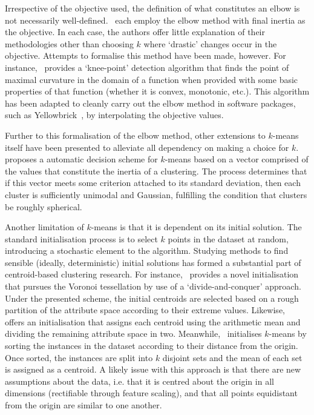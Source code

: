 Irrespective of the objective used, the definition of what constitutes an elbow
is not necessarily well-defined.~\cite{Sujatha2013,Syakur2018} each employ the
elbow method with final inertia as the objective. In each case, the authors
offer little explanation of their methodologies other than choosing \(k\) where
`drastic' changes occur in the objective. Attempts to formalise this method have
been made, however. For instance,~\cite{Satopaa2011} provides a `knee-point'
detection algorithm that finds the point of maximal curvature in the domain of a
function when provided with some basic properties of that function (whether it
is convex, monotonic, etc.). This algorithm has been adapted to cleanly carry
out the elbow method in software packages, such as
Yellowbrick~\cite{Bengfort2019}, by interpolating the objective values.

Further to this formalisation of the elbow method, other extensions to
\(k\)-means itself have been presented to alleviate all dependency on making a
choice for \(k\).~\cite{Olukanmi2019} proposes a automatic decision scheme for
\(k\)-means based on a vector comprised of the values that constitute the
inertia of a clustering. The process determines that if this vector meets some
criterion attached to its standard deviation, then each cluster is sufficiently
unimodal and Gaussian, fulfilling the condition that clusters be roughly
spherical.

Another limitation of \(k\)-means is that it is dependent on its initial
solution. The standard initialisation process is to select \(k\) points in the
dataset at random, introducing a stochastic element to the algorithm. Studying
methods to find sensible (ideally, deterministic) initial solutions has formed a
substantial part of centroid-based clustering research. For
instance,~\cite{Manoharan2016} provides a novel initialisation that pursues the
Voronoi tessellation by use of a `divide-and-conquer' approach. Under the
presented scheme, the initial centroids are selected based on a rough partition
of the attribute space according to their extreme values.
Likewise,~\cite{Singh2013} offers an initialisation that assigns each centroid
using the arithmetic mean and dividing the remaining attribute space in two.
Meanwhile,~\cite{Katara2015} initialises \(k\)-means by sorting the instances in
the dataset according to their distance from the origin. Once sorted, the
instances are split into \(k\) disjoint sets and the mean of each set is
assigned as a centroid. A likely issue with this approach is that there are new
assumptions about the data, i.e. that it is centred about the origin in all
dimensions (rectifiable through feature scaling), and that all points
equidistant from the origin are similar to one another.

